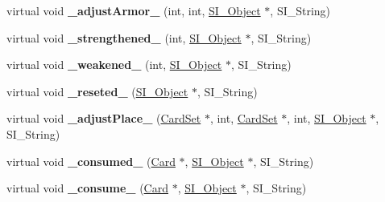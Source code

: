 \begin{DoxyCompactItemize}
\item 
\mbox{\label{class_card_a6ce9a7fb0dc2b38981ccab8216a5588a}} 
virtual void {\bfseries \+\_\+adjust\+Armor\+\_\+} (int, int, \hyperlink{class_s_i___object}{S\+I\+\_\+\+Object} $\ast$, S\+I\+\_\+\+String)
\item 
\mbox{\label{class_card_a67ffdf0e225ded605fa32ef3d6890a2d}} 
virtual void {\bfseries \+\_\+strengthened\+\_\+} (int, \hyperlink{class_s_i___object}{S\+I\+\_\+\+Object} $\ast$, S\+I\+\_\+\+String)
\item 
\mbox{\label{class_card_a63ec79b62dd31b7f79f3819267e21d38}} 
virtual void {\bfseries \+\_\+weakened\+\_\+} (int, \hyperlink{class_s_i___object}{S\+I\+\_\+\+Object} $\ast$, S\+I\+\_\+\+String)
\item 
\mbox{\label{class_card_a2dc7770bef7278725955080a4e3d2a04}} 
virtual void {\bfseries \+\_\+reseted\+\_\+} (\hyperlink{class_s_i___object}{S\+I\+\_\+\+Object} $\ast$, S\+I\+\_\+\+String)
\item 
\mbox{\label{class_card_a327252206ff2240215bc387d943b641c}} 
virtual void {\bfseries \+\_\+adjust\+Place\+\_\+} (\hyperlink{class_card_set}{Card\+Set} $\ast$, int, \hyperlink{class_card_set}{Card\+Set} $\ast$, int, \hyperlink{class_s_i___object}{S\+I\+\_\+\+Object} $\ast$, S\+I\+\_\+\+String)
\item 
\mbox{\label{class_card_ade9c389ec3c13bbc84cc23320d787665}} 
virtual void {\bfseries \+\_\+consumed\+\_\+} (\hyperlink{class_card}{Card} $\ast$, \hyperlink{class_s_i___object}{S\+I\+\_\+\+Object} $\ast$, S\+I\+\_\+\+String)
\item 
\mbox{\label{class_card_a46b1bf27235cf35ecea38eca05ac6756}} 
virtual void {\bfseries \+\_\+consume\+\_\+} (\hyperlink{class_card}{Card} $\ast$, \hyperlink{class_s_i___object}{S\+I\+\_\+\+Object} $\ast$, S\+I\+\_\+\+String)
\end{DoxyCompactItemize}
